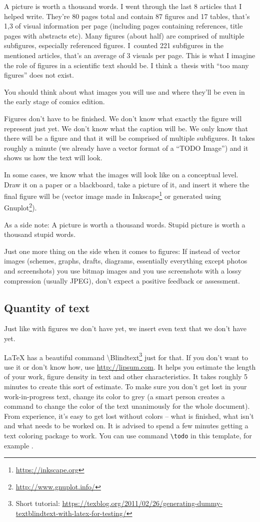 A picture is worth a thousand words. I went through the last 8 articles that I helped write. They're 80 pages total and contain 87 figures and 17 tables, that's 1,3 of visual information per page (including pages containing references, title pages with abstracts etc). Many figures (about half) are comprised of multiple subfigures, especially referenced figures. I~counted 221 subfigures in the mentioned articles, that's an average of 3 visuals per page. This is what I imagine the role of figures in a scientific text should be. I think a~thesis with ``too many figures'' does not exist.

You should think about what images you will use and where they'll be even in the early stage of comics edition.

Figures don't have to be finished. We don't know what exactly the figure will represent just yet. We don't know what the caption will be. We only know that there will be a figure and that it will be comprised of multiple subfigures. It takes roughly a minute (we already have a vector format of a ``TODO Image'') and it shows us how the text will look.

In some cases, we know what the images will look like on a conceptual level. Draw it on a paper or a blackboard, take a picture of it, and insert it where the final figure will be (vector image made in Inkscape\footnote{\url{https://inkscape.org}} or generated using Gnuplot\footnote{\url{http://www.gnuplot.info/}}). 

As a side note: A picture is worth a thousand words. Stupid picture is worth a thousand stupid words.

Just one more thing on the side when it comes to figures: If instead of vector images (schemes, graphs, drafts, diagrams, essentially everything except photos and screenshots) you use bitmap images and you use screenshots with a lossy compression (usually JPEG), don't expect a positive feedback or assessment.

\subsection*{Quantity of text}

Just like with figures we don't have yet, we insert even text that we don't have yet.

LaTeX has a beautiful command \textbackslash Blindtext\footnote{Short tutorial: \url{https://texblog.org/2011/02/26/generating-dummy-textblindtext-with-latex-for-testing/}} just for that. If you don't want to use it or don't know how, use \url{http://lipsum.com}. It helps you estimate the length of your work, figure density in text and other characteristics. It takes roughly 5 minutes to create this sort of estimate. To make sure you don't get lost in your work-in-progress text, change its color to grey (a smart person creates a command to change the color of the text unanimously for the whole document). From experience, it's easy to get lost without colors -- what is finished, what isn't and what needs to be worked on. It is advised to spend a few minutes getting a text coloring package to work. You can use command \verb|\todo| in this template, for example .


